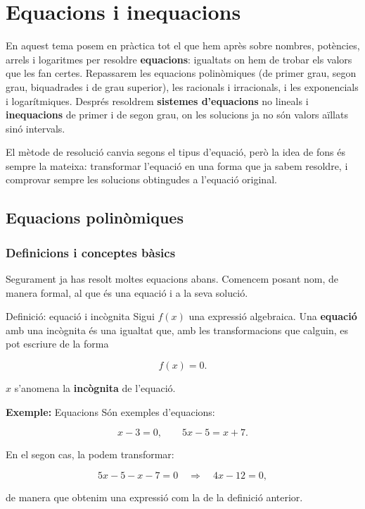 
\chapter{Equacions i inequacions}

En aquest tema posem en pràctica tot el que hem après sobre nombres, potències, arrels i logaritmes per resoldre \textbf{equacions}: igualtats on hem de trobar els valors que les fan certes. Repassarem les equacions polinòmiques (de primer grau, segon grau, biquadrades i de grau superior), les racionals i irracionals, i les exponencials i logarítmiques. Després resoldrem \textbf{sistemes d'equacions} no lineals i \textbf{inequacions} de primer i de segon grau, on les solucions ja no són valors aïllats sinó intervals.

El mètode de resolució canvia segons el tipus d'equació, però la idea de fons és sempre la mateixa: transformar l'equació en una forma que ja sabem resoldre, i comprovar sempre les solucions obtingudes a l'equació original.

\section{Equacions polinòmiques}

\subsection{Definicions i conceptes bàsics}

Segurament ja has resolt moltes equacions abans. Comencem posant nom, de manera formal, al que és una equació i a la seva solució.

\begin{definicio}{Definició: equació i incògnita}
Sigui $f(x)$ una expressió algebraica. Una \textbf{equació} amb una incògnita és una igualtat que, amb les transformacions que calguin, es pot escriure de la forma

\[
f(x)=0.
\]

$x$ s'anomena la \textbf{incògnita} de l'equació.
\end{definicio}

\begin{exemple}{\textbf{Exemple:} Equacions}
Són exemples d'equacions:

\[
x-3=0, \qquad 5x-5=x+7.
\]

En el segon cas, la podem transformar:

\[
5x-5-x-7=0 \quad \Rightarrow \quad 4x-12=0,
\]

de manera que obtenim una expressió com la de la definició anterior.
\end{exemple}

